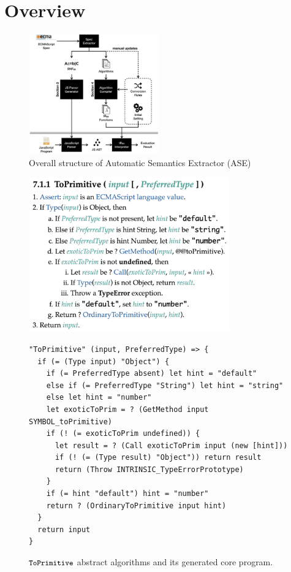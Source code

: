 \section{Overview}

\begin{figure}
  \centering
  \includegraphics[width=0.5\textwidth]{img/overview.png}
  \caption{Overall structure of Automatic Semantics Extractor (ASE)}
  \label{fig:overview}
\end{figure}

\begin{figure}
  \centering
  \includegraphics[height=18em]{img/to_primitive.png}
  \begin{lstlisting}[style=ires]
"ToPrimitive" (input, PreferredType) => {
  if (= (Type input) "Object") {
    if (= PreferredType absent) let hint = "default"
    else if (= PreferredType "String") let hint = "string"
    else let hint = "number"
    let exoticToPrim = ? (GetMethod input SYMBOL_toPrimitive)
    if (! (= exoticToPrim undefined)) {
      let result = ? (Call exoticToPrim input (new [hint]))
      if (! (= (Type result) "Object")) return result
      return (Throw INTRINSIC_TypeErrorPrototype)
    }
    if (= hint "default") hint = "number"
    return ? (OrdinaryToPrimitive input hint)
  }
  return input
}
  \end{lstlisting}
  \caption{\( \texttt{\small ToPrimitive} \) abstract algorithms
  and its generated core program.}
  \label{fig:to-primitive}
\end{figure}

